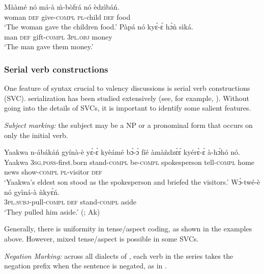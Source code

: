 \documentclass[output=paper]{langsci/langscibook}
\begin{document}
\ea\label{ex:18.osam}
\ea\label{ex:18a.osam}
\gll  Mààmé    nó  má-à    \`{m}-bòfrá  nó  èdzìbáń.\\
       woman    \textsc{def}  give-\textsc{compl}  \textsc{pl}-child  \textsc{def}  food\\
\glt   `The woman gave the children food.'
\ex\label{ex:18b.osam}
\gll   Pàpá  nó  kyɛ́-ɛ̀    hɔ̀ǹ    sìká.\\
       man  \textsc{def}  gift-\textsc{compl}  3\textsc{pl}.\textsc{obj}  money\\
\glt   `The man gave them money.'  
\z 
\z 


\subsubsection{Serial verb constructions}\label{§2.3.4:serial.osam}

One feature of  syntax crucial to valency discussions is serial verb constructions (\textsc{SVC}).  serialization has been studied extensively (see, for example, \citealt{lord1973,schachter1974,essilfie1977,forson1990,osam1994a,osam1994b,osam1997,osam2004,osam2014,agyeman2002,hellanetal2003,kambon2012}). Without going into the details of  SVCs, it is important to identify some salient features.

\textit{Subject marking:} the subject may be a NP or a pronominal form that occurs on only the initial verb. 

\ea\label{ex:19.osam}
\ea\label{ex:19a.osam}
\gll   Yaakwa  n-ábákáń     gyínà-è  yɛ́-ɛ̀ kyèámé bɔ́-ɔ̀      fíé   àmàǹdzɛ̀ɛ́  kyérɛ̀-ɛ̀    à-hɔ́hó    nó.\\
       Yaakwa  \textsc{3sg.poss}-first.born  stand-\textsc{compl}  be-\textsc{compl}   spokesperson tell-\textsc{compl}  home  news    show-\textsc{compl}  \textsc{pl}-visitor  \textsc{def}\\
\glt   `Yaakwa's eldest son stood as the spokesperson and briefed the visitors.' \citep[83]{krampah1970}
\ex\label{ex:19b.osam}
\gll   Wɔ̀-twé-è    nó  gyìná-à  ǹkyɛ́ń.\\
       \textsc{3pl.subj}-pull\textsc{-compl}  \textsc{def}  stand-\textsc{compl}  aside\\
\glt   `They pulled him aside.' (\citealt[31]{adi1973}; Ak)
\z 
\z 


Generally, there is uniformity in tense/aspect coding, as shown in the examples above. However, mixed tense/aspect is possible in some SVCs. 


\textit{Negation Marking:} across all dialects of , each verb in the series takes the negation prefix when the sentence is negated, as in . 
\end{document}

